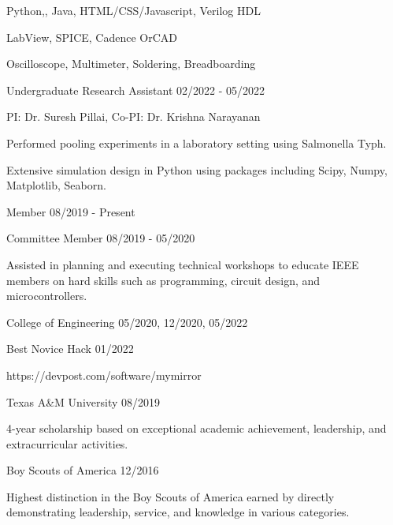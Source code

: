 \documentclass[11pt]{article}
\begin{document}

      {Python,\CPP, Java, HTML/CSS/Javascript, Verilog HDL}

      {LabView, SPICE, Cadence OrCAD}

      {Oscilloscope, Multimeter, Soldering, Breadboarding}


\begin{description}
\squish
{}
           {Undergraduate Research Assistant}
           {02/2022 - 05/2022} 

PI: Dr. Suresh Pillai, Co-PI: Dr. Krishna Narayanan

Performed pooling experiments in a laboratory setting using Salmonella Typh.

Extensive simulation design in Python using packages including Scipy, Numpy, Matplotlib, Seaborn.

           {Member}
           {08/2019 - Present}

           {Committee Member}
           {08/2019 - 05/2020}

Assisted in planning and executing technical workshops to educate IEEE members on hard skills
such as programming, circuit design, and microcontrollers.

\end{description}


\begin{description}
\squish
{}
           {College of Engineering}
           {05/2020, 12/2020, 05/2022}

           {Best Novice Hack}
           {01/2022}

https://devpost.com/software/mymirror

           {Texas A\&M University}
           {08/2019}

4-year scholarship based on exceptional academic achievement, leadership, and extracurricular activities.

           {Boy Scouts of America}
           {12/2016}

Highest distinction in the Boy Scouts of America earned by directly demonstrating
leadership, service, and knowledge in various categories.

\end{description}
\end{document}
